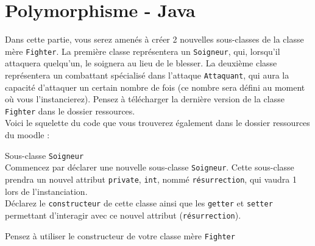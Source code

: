 \section{Polymorphisme - Java}

Dans cette partie, vous serez amenés à créer 2 nouvelles sous-classes de la classe mère \lstinline{Fighter}. La première classe représentera un \lstinline{Soigneur}, qui, lorsqu'il attaquera quelqu'un, le soignera au lieu de le blesser. La deuxième classe représentera un combattant spécialisé dans l'attaque \lstinline{Attaquant}, qui aura la capacité d'attaquer un certain nombre de fois (ce nombre sera défini au moment où vous l'instancierez). Pensez à télécharger la dernière version de la classe \lstinline{Fighter} dans le dossier ressources.\\

Voici le squelette du code que vous trouverez également dans le dossier ressources du moodle : \\



\begin{Exercice}[5 minutes] Sous-classe \lstinline{Soigneur} \\

Commencez par déclarer une nouvelle sous-classe \lstinline{Soigneur}. Cette sous-classe prendra un nouvel attribut \lstinline{private}, \lstinline{int}, nommé \lstinline{résurrection}, qui vaudra 1 lors de l'instanciation. \\

Déclarez le \lstinline{constructeur} de cette classe ainsi que les \lstinline{getter} et \lstinline{setter} permettant d'interagir avec ce nouvel attribut (\lstinline{résurrection}). \\

\begin{conseil}
Pensez à utiliser le constructeur de votre classe mère \lstinline{Fighter}
\end{conseil}

\begin{solution}
	
\end{solution}

\end{Exercice}

